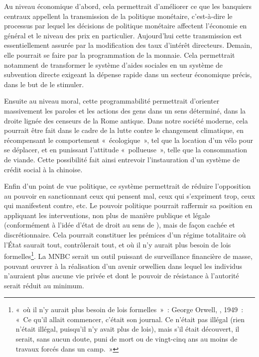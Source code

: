 Au niveau économique d'abord, cela permettrait d'améliorer ce que les banquiers centraux appellent la transmission de la politique monétaire, c'est-à-dire le processus par lequel les décisions de politique monétaire affectent l'économie en général et le niveau des prix en particulier. Aujourd'hui cette transmission est essentiellement assurée par la modification des taux d'intérêt directeurs. Demain, elle pourrait se faire par la programmation de la monnaie. Cela permettrait notamment de transformer le système d'aides sociales en un système de subvention directe exigeant la dépense rapide dans un secteur économique précis, dans le but de le stimuler.

Ensuite au niveau moral, cette programmabilité permettrait d'orienter massivement les paroles et les actions des gens dans un sens déterminé, dans la droite lignée des censeurs de la Rome antique. Dans notre société moderne, cela pourrait être fait dans le cadre de la lutte contre le changement climatique, en récompensant le comportement «~écologique~», tel que la location d'un vélo pour se déplacer, et en punissant l'attitude «~pollueuse~», telle que la consommation de viande. Cette possibilité fait ainsi entrevoir l'instauration d'un système de crédit social à la chinoise.

Enfin d'un point de vue politique, ce système permettrait de réduire l'opposition au pouvoir en sanctionnant ceux qui pensent mal, ceux qui s'expriment trop, ceux qui manifestent contre, etc. Le pouvoir politique pourrait raffermir sa position en appliquant les interventions, non plus de manière publique et légale (conformément à l'idée d'état de droit au sens de ), mais de façon cachée et discrétionnaire. Cela pourrait constituer les prémices d'un régime totalitaire où l'État saurait tout, contrôlerait tout, et où il n'y aurait plus besoin de lois formelles\footnote{«~où il n'y aurait plus besoin de lois formelles~»~: George Orwell, , 1949~: «~Ce qu'il allait commencer, c'était son journal. Ce n'était pas illégal (rien n'était illégal, puisqu'il n'y avait plus de lois), mais s'il était découvert, il serait, sans aucun doute, puni de mort ou de vingt-cinq ans au moins de travaux forcés dans un camp.~»}. La MNBC serait un outil puissant de surveillance financière de masse, pouvant œuvrer à la réalisation d'un avenir orwellien dans lequel les individus n'auraient plus aucune vie privée et dont le pouvoir de résistance à l'autorité serait réduit au minimum.

